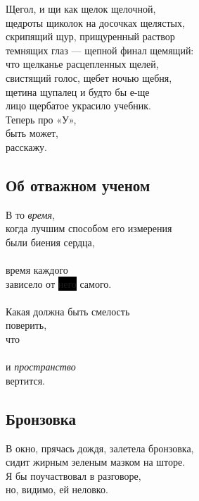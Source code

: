 \documentclass[12pt,a5paper]{report}
\newcommand{\hl}[1]{\colorbox{black}{#1}} %
\begin{document}
Щегол, и щи как щелок щелочной,\\
щедроты щиколок на досочках щелястых,\\
скрипящий щур, прищуренный раствор\\
темнящих глаз — щепной финал щемящий:\\

что щелканье расцепленных щелей,\\
свистящий голос, щебет ночью щебня,\\
щетина щупалец и будто бы е-ще \\
лицо щербатое украсило учебник.\\

Теперь про «У»,\\
быть может,\\
расскажу.\\


\subsection{Об отважном ученом}

В то \emph{время},\\
когда лучшим способом его измерения\\
были биения сердца,\\
\\
время каждого\\
зависело от \hl{него} самого.\\
\\
Какая должна быть смелость\\
поверить,\\
что\\
\\
и \emph{пространство}\\
вертится.\\
\newpage


\subsection{Бронзовка}
В окно, прячась дождя, залетела бронзовка,\\
сидит жирным зеленым мазком на шторе.\\

Я бы поучаствовал в разговоре,\\
но, видимо, ей неловко.\\
\newline
\newline

\colorbox{black!50!green}{\phantom{у}}
\newpage
\end{document}
